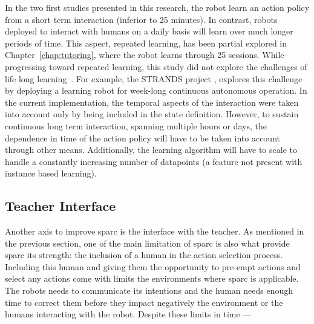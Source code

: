 In the two first studies presented in this research, the robot learn an action policy from a short term interaction (inferior to 25 minutes). In contrast, robots deployed to interact with humans on a daily basis will learn over much longer periods of time. This aspect, repeated learning, has been partial explored in Chapter~\ref{chap:tutoring}, where the robot learns through 25 sessions. While progressing toward repeated learning, this study did not explore the challenges of life long learning~\citep{thrun1995lifelong}. For example, the STRANDS project \cite{hawes2017strands}, explores this challenge by deploying a learning robot for week-long continuous autonomous operation. In the current implementation, the temporal aspects of the interaction were taken into account only by being included in the state definition. However, to sustain continuous long term interaction, spanning multiple hours or days, the dependence in time of the action policy will have to be taken into account through other means. Additionally, the learning algorithm will have to scale to handle a constantly increasing number of datapoints (a feature not present with instance based learning).


\subsection{Teacher Interface}

Another axis to improve \gls{sparc} is the interface with the teacher. As mentioned in the previous section, one of the main limitation of \gls{sparc} is also what provide \gls{sparc} its strength: the inclusion of a human in the action selection process. Including this human and giving them the opportunity to pre-empt actions and select any actions come with limits the environments where \gls{sparc} is applicable. The robots needs to communicate its intentions and the human needs enough time to correct them before they impact negatively the environment or the humans interacting with the robot. Despite these limits in time ---

